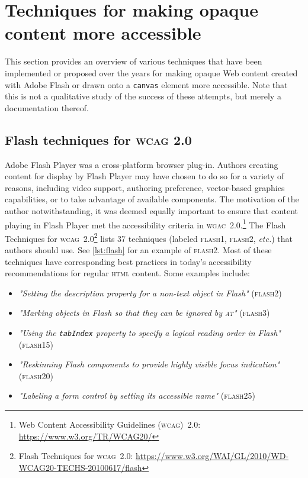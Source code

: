 \documentclass[sigconf]{acmart}
\begin{document}
\section{Techniques for making opaque content more accessible}

This section provides an overview of various techniques that have been implemented or proposed over the years for making opaque Web content created with Adobe Flash or drawn onto a \texttt{canvas} element more accessible. Note that this is not a qualitative study of the success of these attempts, but merely a documentation thereof.

\subsection{Flash techniques for \textsc{wcag} 2.0}

Adobe Flash Player was a cross-platform browser plug-in. Authors creating content for display by Flash Player may have chosen to do so for a variety of reasons, including video support, authoring preference, vector-based graphics capabilities, or to take advantage of available components. The motivation of the author notwithstanding, it was deemed equally important to ensure that content playing in Flash Player met the accessibility criteria in \textsc{wgac}\ 2.0.\footnote{Web Content Accessibility Guidelines (\textsc{wcag})\ 2.0: \url{https://www.w3.org/TR/WCAG20/}} The Flash Techniques for \textsc{wcag}\ 2.0\footnote{Flash Techniques for \textsc{wcag}\ 2.0: \url{https://www.w3.org/WAI/GL/2010/WD-WCAG20-TECHS-20100617/flash}} lists 37 techniques (labeled \textsc{flash}1, \textsc{flash}2, \textit{etc.}) that authors should use. See \autoref{lst:flash} for an example of \textsc{flash}2. Most of these techniques have corresponding best practices in today's accessibility recommendations for regular \textsc{html} content. Some examples include:

\begin{itemize}
  \item \textit{"Setting the description property for a non-text object in Flash"} (\textsc{flash}2)
  \item \textit{"Marking objects in Flash so that they can be ignored by \textsc{at}"} (\textsc{flash}3)
  \item \textit{"Using the \texttt{tabIndex} property to specify a logical reading order in Flash"} (\textsc{flash}15)
  \item \textit{"Reskinning Flash components to provide highly visible focus indication"} (\textsc{flash}20)
  \item \textit{"Labeling a form control by setting its accessible name"} (\textsc{flash}25)
\end{itemize}
\end{document}
